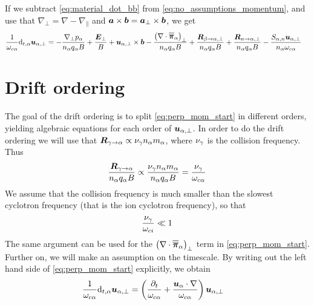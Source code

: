 %
If we subtract \cref{eq:material_dot_bb} from \cref{eq:no_assumptions_momentum}, and use that  $\nabla_\perp = \nabla - \nabla_\|$ and $\boldsymbol{a}\times\boldsymbol{b}=\boldsymbol{a}_\perp\times\boldsymbol{b}$, we get
%
\begin{align}
 \frac{1}{\omega_{c\alpha}}\text{d}_{t,\alpha} \boldsymbol{u}_{\alpha,\perp}
 &=
 -
 \frac{
   \nabla_\perp p_\alpha
 }{n_\alpha  q_\alpha B}
 +
 \frac{\boldsymbol{E}_\perp}{B}
 +
 \boldsymbol{u}_{\alpha,\perp}\times\boldsymbol{b}
 -
  \frac{
   \left(\nabla\cdot\boldsymbol{\overline{\overline{\pi}}}_\alpha\right)_\perp
 }{n_\alpha  q_\alpha B}
 +
 \frac{
   \boldsymbol{R}_{\beta \to \alpha,\perp}
 }{n_\alpha q_\alpha B}
 +
 \frac{
   \boldsymbol{R}_{n \to \alpha,\perp}
 }{n_\alpha q_\alpha B}
 -
 \frac{
     S_{\alpha,n}\boldsymbol{u}_{\alpha,\perp}
 }{n_\alpha \omega_{c\alpha}}
 \label{eq:perp_mom_start}
\end{align}

\section{Drift ordering}\label{sec:drift_order}
The goal of the drift ordering is to split \cref{eq:perp_mom_start} in different orders, yielding algebraic equations for each order of $\boldsymbol{u}_{\alpha,\perp}$.
In order to do the drift ordering we will use that $\boldsymbol{R}_{\gamma \to \alpha} \propto \nu_\gamma n_\alpha m_\alpha$, where $\nu_\gamma$ is the collision frequency.
Thus
%
\begin{align*}
 \frac{\boldsymbol{R}_{\gamma \to \alpha}}{n_\alpha q_\alpha B}
 \propto \frac{\nu_\gamma n_\alpha m_\alpha}{n_\alpha q_\alpha B}
 = \frac{\nu_\gamma}{\omega_{c\alpha}}
\end{align*}
%
We assume that the collision frequency is much smaller than the slowest cyclotron frequency (that is the ion cyclotron frequency), so that
%
\begin{align*}
 \frac{\nu_\gamma}{\omega_{ci}} \ll 1
\end{align*}
%
The same argument can be used for the $\left(\nabla\cdot \boldsymbol{\overline{\overline{\pi}}}_\alpha\right)_\perp$ term in \cref{eq:perp_mom_start}.
Further on, we will make an assumption on the timescale.
By writing out the left hand side of \cref{eq:perp_mom_start} explicitly, we obtain
%
\begin{align}
 \frac{1}{\omega_{c\alpha}}\text{d}_{t,\alpha} \boldsymbol{u}_{\alpha,\perp} &=
 \left(\frac{\partial_t}{\omega_{c\alpha}} +
 \frac{\boldsymbol{u}_{\alpha}\cdot\nabla}{\omega_{c\alpha}}\right) \boldsymbol{u}_{\alpha,\perp}
 \label{eq:LHSPerpMom}
\end{align}
